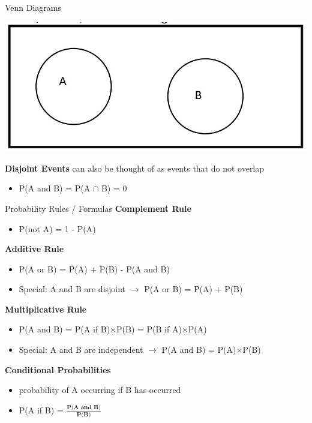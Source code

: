 \documentclass{beamer}
\begin{document}
\begin{frame}{Venn Diagrams}
\begin{center}
\includegraphics[scale=.5]{img/venn_diagram2.jpg} \vspace{3mm}
\end{center}
\textbf{Disjoint Events} can also be thought of as events that do not overlap
\begin{itemize}
    \item P(A and B) = P(A $\cap$ B) = 0
\end{itemize}
    
\end{frame}


\begin{frame}{Probability Rules / Formulas}
\textbf{Complement Rule}
\begin{itemize}
    \item P(not A) = 1 - P(A)
\end{itemize} \vspace{4mm}

\textbf{Additive Rule}
\begin{itemize}
    \item P(A or B) = P(A) + P(B) - P(A and B)
    \item Special: A and B are disjoint $\rightarrow$ P(A or B) = P(A) + P(B)
\end{itemize} \vspace{4mm}

\textbf{Multiplicative Rule}
\begin{itemize}
    \item P(A and B) = P(A if B)$\times$P(B) = P(B if A)$\times$P(A)
    \item Special: A and B are independent $\rightarrow$ P(A and B) = P(A)$\times$P(B)
\end{itemize} \vspace{4mm}

\textbf{Conditional Probabilities}
\begin{itemize}
    \item probability of A occurring if B has occurred
    \item P(A if B) = $\frac{\textbf{P(A and B)}}{\textbf{P(B)}}$
\end{itemize}
\end{frame}


%
%
\end{document}
